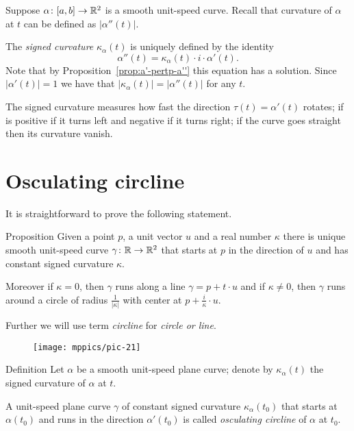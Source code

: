 Suppose $\alpha\colon[a,b]\to\mathbb{R}^2$ is a smooth unit-speed curve.
Recall that curvature of $\alpha$ at $t$ can be defined as $|\alpha''(t)|$.

The \emph{signed curvature} $\kappa_\alpha(t)$ is uniquely defined by
the identity 
\[\alpha''(t)=\kappa_\alpha(t)\cdot i\cdot \alpha'(t).\]
Note that by Proposition~\ref{prop:a'-pertp-a''} this equation has a solution.
Since $|\alpha'(t)|=1$ we have that $|\kappa_\alpha(t)|=|\alpha''(t)|$ for any $t$.

The signed curvature measures how fast the direction $\tau(t)=\alpha'(t)$ rotates;
if is positive if it turns left and negative if it turns right;
if the curve goes straight then its curvature vanish.

\section{Osculating circline}

It is straightforward to prove the following statement.

\begin{thm}{Proposition}\label{prop:circline}
Given a point $p$,
a unit vector $u$ 
and a real number $\kappa$ there is unique smooth unit-speed curve $\gamma\colon\mathbb{R}\to\mathbb{R}^2$ 
that starts at $p$ in the direction of $u$ and has constant signed curvature $\kappa$.

Moreover if $\kappa=0$, then $\gamma$ runs along a line $\gamma=p+t\cdot u$
and if $\kappa\ne 0$, then $\gamma$ runs around a circle of radius $\tfrac1{|\kappa|}$ with center at $p+\tfrac i\kappa\cdot u$. 
\end{thm}

Further we will use term \emph{circline} for \emph{circle or line}.

{

\begin{wrapfigure}{r}{30 mm}
\vskip-4mm
\centering
\texttt{[image: mppics/pic-21]}
\vskip0mm
\end{wrapfigure}

\begin{thm}{Definition}
Let $\alpha$ be a smooth unit-speed plane curve;
denote by $\kappa_\alpha(t)$ the signed curvature of $\alpha$ at $t$.

A unit-speed plane curve $\gamma$ of constant signed curvature $\kappa_\alpha(t_0)$ that starts at $\alpha(t_0)$ and runs in the direction $\alpha'(t_0)$ is called \emph{osculating circline} of $\alpha$ at $t_0$.
\end{thm}

}

